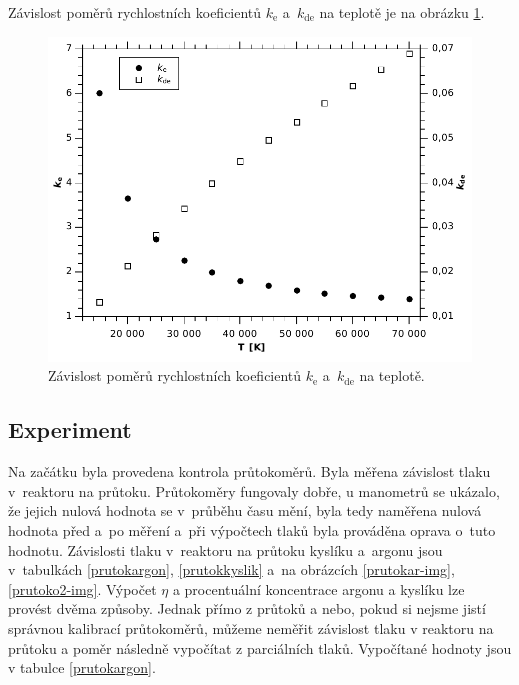 \documentclass[12pt]{article}
\begin{document}
Závislost poměrů rychlostních koeficientů  $k_\mathrm{e}$ a~$k_\mathrm{de}$ na teplotě je na obrázku \ref{rk}. 

\begin{figure}[htbp]
\begin{center}
\includegraphics[width=13cm]{rk.pdf}
\caption{Závislost poměrů rychlostních koeficientů  $k_\mathrm{e}$ a~$k_\mathrm{de}$ na teplotě.}
\label{rk}
\end{center}
\end{figure}

\subsection{Experiment}

Na začátku byla provedena kontrola průtokoměrů. Byla měřena závislost tlaku v~reaktoru na průtoku. Průtokoměry fungovaly dobře, u manometrů se ukázalo, že jejich nulová hodnota se v~průběhu času mění, byla tedy naměřena nulová hodnota před a~po měření a~při výpočtech tlaků byla prováděna oprava o~tuto hodnotu. Závislosti tlaku v~reaktoru na průtoku kyslíku a~argonu jsou v~tabulkách \ref{prutokargon}, \ref{prutokkyslik} a~na obrázcích \ref{prutokar-img},\ref{prutoko2-img}. Výpočet $\eta$ a procentuální koncentrace argonu a kyslíku lze provést dvěma způsoby. Jednak přímo z průtoků a nebo, pokud si nejsme jistí správnou kalibrací průtokoměrů, můžeme neměřit závislost tlaku v reaktoru na průtoku a poměr následně vypočítat z parciálních tlaků. Vypočítané hodnoty jsou v tabulce \ref{prutokargon}.
\end{document}
